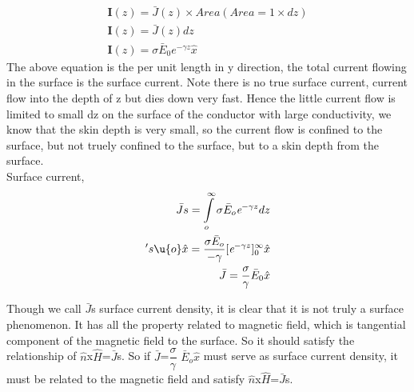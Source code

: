 \begin{align}
\textbf{I}(z)=\bar{J}(z)\times Area (Area=1\times dz)\\
\textbf{I}(z)=\bar{J}(z)dz\\
\textbf{I}(z)=\sigma\bar{E}_0\textit{e}^{-\gamma z} \hat{x}
\end{align}
The above equation is the per unit length in y direction, the total current flowing in the surface is the surface current. Note there is no true surface current, current flow into the depth of z but dies down very fast. Hence the little current flow is limited to small dz on the surface of the conductor with large conductivity, we know that the skin depth is very small, so the current flow is confined to the surface, but not truely confined to the surface, but to a skin depth from the surface.\\
Surface current,
\begin{align}
\bar{J}s=\int\limits_o^\infty\sigma\bar{E}_o\textit{e}^{-\gamma z}dz\\'{s}\u{o} \hat{x}=\frac{\sigma\bar{E}_o}{-\gamma}[\textit{e}^{-\gamma z}]_0^\infty \hat{x}\\
\bar{J}=\frac{\sigma}{\gamma}\bar{E}_0\hat{x}
\end{align}


Though we call $\bar{J}$s surface current density, it is clear that it is not truly a surface phenomenon. It has all the property related to magnetic field, which is tangential component of the magnetic field to the surface. So it should satisfy the relationship of $\hat{n}$x$\hat{H}$=$\bar{J}$s. So if 
$\bar{J}$=$\dfrac{\sigma}{\gamma}$
$\bar{E}$$_o$$\hat{x}$ must serve as surface current density, it must be related to the magnetic field and satisfy $\hat{n}$x$\hat{H}$=$\bar{J}$s.\\

